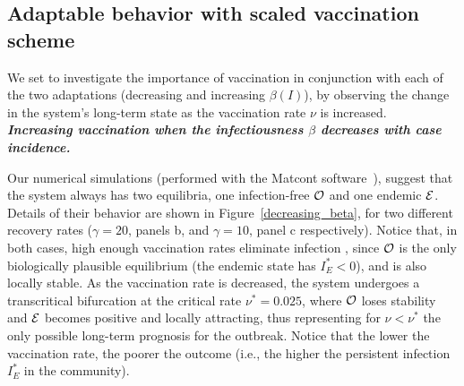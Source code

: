 \documentclass[10pt]{article}
\begin{document}

\subsection{Adaptable behavior with scaled vaccination scheme}
\quad

\vspace{2mm}
\noindent We set to investigate the importance of vaccination in conjunction with each of the two adaptations (decreasing and increasing $\beta(I)$), by observing the change in the system's long-term state as the vaccination rate $\nu$ is increased.\\ 

\vspace{2mm}
\noindent \textbf{\emph{ Increasing vaccination when the infectiousness $\beta$ decreases with case incidence.}} 

\noindent Our numerical simulations (performed with the Matcont software~\cite{}), suggest that the system always has two equilibria, one infection-free ${\cal O}$ and one endemic ${\cal E}$. Details of their behavior are shown in Figure~\ref{decreasing_beta}, for two different recovery rates ($\gamma=20$, panels b, and $\gamma=10$, panel c respectively). Notice that, in both cases, high enough vaccination rates eliminate infection , since ${\cal O}$ is the only biologically plausible equilibrium (the endemic state has $I_E^*<0$), and is also locally stable. As the vaccination rate is decreased, the system undergoes a transcritical bifurcation at the critical rate $\nu^*=0.025$, where ${\cal O}$ loses stability and  ${\cal E}$ becomes positive and locally attracting, thus representing for $\nu<\nu^*$ the only possible long-term prognosis for the outbreak. Notice that the lower the vaccination rate, the poorer the outcome (i.e., the higher the persistent infection $I_E^*$ in the community).
\end{document}
